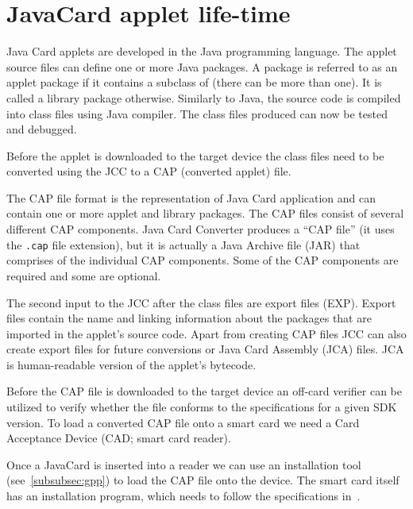 \section{JavaCard applet life-time}\label{sec:jc:lifecycle}




Java Card applets are developed in the Java programming language. The applet source files can define one or more Java packages. A package is referred to as an applet package if it contains a subclass of  (there can be more than one). It is called a library package otherwise.  Similarly to Java, the source code is compiled into class files using Java compiler. The class files produced can now be tested and debugged.

Before the applet is downloaded to the target device the class files need to be converted using the JCC to a CAP (converted applet) file. 

The CAP file format is the representation of Java Card application and can contain one or more applet and library packages. The CAP files consist of several different CAP components. Java Card Converter produces a ``CAP file'' (it uses the \texttt{.cap} file extension), but it is actually a Java Archive file (JAR) that comprises of the individual CAP components. Some of the CAP components are required and some are optional.

The second input to the JCC after the class files are export files (EXP). Export files contain the name and linking information about the packages that are imported in the applet's source code.
Apart from creating CAP files JCC can also create export files for future conversions or Java Card Assembly (JCA) files. JCA is human-readable version of the applet's bytecode.

Before the CAP file is downloaded to the target device an off-card verifier can be utilized to verify whether the file conforms to the specifications for a given SDK version. To load a converted CAP file onto a smart card we need a Card Acceptance Device (CAD; smart card reader). 

Once a JavaCard is inserted into a reader we can use an installation tool (see~\ref{subsubsec:gpp}) to load the CAP file onto the device. The smart card itself has an installation program, which needs to follow the specifications in~\cite{jcspecs31download}.


